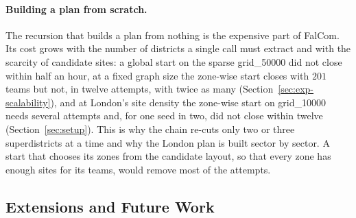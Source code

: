\documentclass[preprint,12pt,authoryear]{elsarticle}
\theoremstyle{definition}
\begin{document}
\paragraph{Building a plan from scratch.}
The recursion that builds a plan from nothing is the expensive part of FalCom. Its cost grows with the number of districts a single call must extract and with the scarcity of candidate sites: a global start on the sparse grid\_50000 did not close within half an hour, at a fixed graph size the zone-wise start closes with $201$ teams but not, in twelve attempts, with twice as many (Section~\ref{sec:exp-scalability}), and at London's site density the zone-wise start on grid\_10000 needs several attempts and, for one seed in two, did not close within twelve (Section~\ref{sec:setup}). This is why the chain re-cuts only two or three superdistricts at a time and why the London plan is built sector by sector. A start that chooses its zones from the candidate layout, so that every zone has enough sites for its teams, would remove most of the attempts.

\subsection{Extensions and Future Work}
\label{sec:extensions}\label{sec:future}
\end{document}
